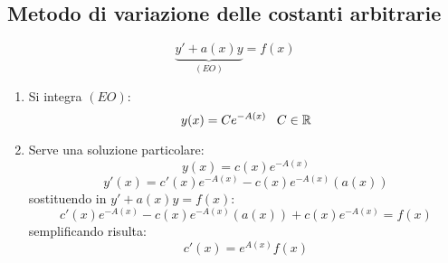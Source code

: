 \subsection{Metodo di variazione delle costanti arbitrarie}
\[
    \underbrace{y' + a(x)y}_{(EO )} = f(x)
\]

\begin{enumerate}
    \item Si integra $(EO)$:
    \[ y(x) = C e^{-A(x)}  \mspace{15mu} C \in \mathbb{R}\]
    \item Serve una soluzione particolare:
    \[ y(x) = c(x) e^{-A(x)} \]
    \[ y'(x) = c'(x) e^{-A(x)} - c(x) e^{-A(x)} (a(x))\] 
    sostituendo in $y' + a(x)y = f(x)$:
    \[ c'(x) e^{-A(x)} - c(x) e^{-A(x)} (a(x)) + c(x) e^{-A(x)} = f(x)\]
    semplificando risulta:
    \[ c'(x) = e^{A(x)} f(x) \]
\end{enumerate}
